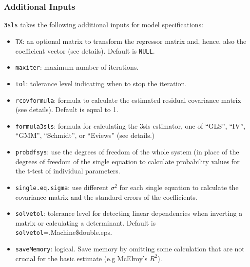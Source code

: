 \documentclass[12pt]{book}%
\begin{document}
\subsubsection{Additional Inputs}
\texttt{3sls} takes the following additional inputs for model
specifications:
\begin{itemize}
\item \texttt{TX}: an optional matrix to transform the regressor
matrix and, hence, also the coefficient vector (see details). Default is \texttt{NULL}.
\item \texttt{maxiter}: maximum number of iterations.
\item \texttt{tol}: tolerance level indicating when to stop the iteration.
\item \texttt{rcovformula}: formula to calculate the estimated residual covariance
matrix (see details). Default is equal to 1.
\item \texttt{formula3sls}: formula for calculating the 3sls estimator, one of ``GLS'',
``IV'', ``GMM'', ``Schmidt'', or ``Eviews'' (see details.)
\item \texttt{probdfsys}: use the degrees of freedom of the whole system
(in place of the degrees of freedom of the single equation to calculate probability
values for the t-test of individual parameters. 
\item \texttt{single.eq.sigma}: use different $\sigma^2$ for each single
equation to calculate the covariance matrix and the standard errors of the coefficients.
\item \texttt{solvetol}: tolerance level for detecting linear dependencies when 
inverting a matrix or calculating a determinant. Default is \texttt {solvetol}=.Machine\$double.eps.
\item \texttt{saveMemory}: logical. Save memory by omitting some calculation that are
not crucial for the basic estimate (e.g McElroy's $R^2$).
\end{itemize}
\end{document}
